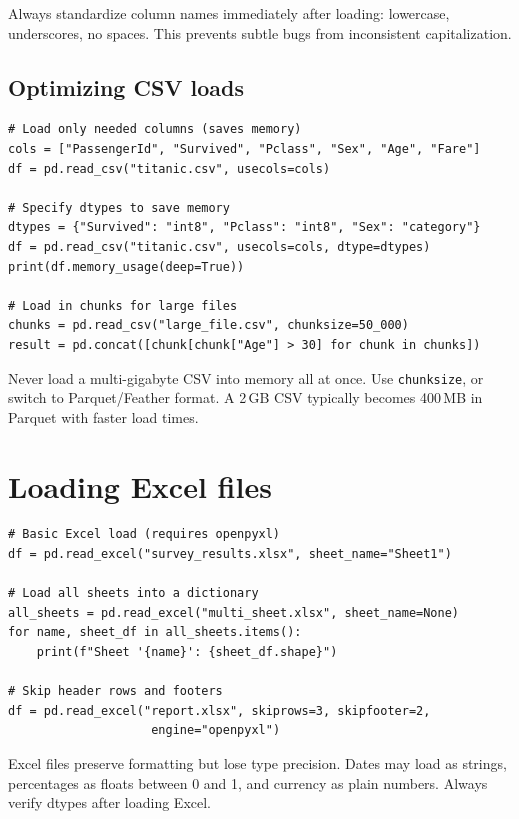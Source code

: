 \begin{preprocesstip}
Always standardize column names immediately after loading: lowercase, underscores, no spaces. This prevents subtle bugs from inconsistent capitalization.
\end{preprocesstip}

\subsection{Optimizing CSV loads}

\begin{verbatim}
# Load only needed columns (saves memory)
cols = ["PassengerId", "Survived", "Pclass", "Sex", "Age", "Fare"]
df = pd.read_csv("titanic.csv", usecols=cols)

# Specify dtypes to save memory
dtypes = {"Survived": "int8", "Pclass": "int8", "Sex": "category"}
df = pd.read_csv("titanic.csv", usecols=cols, dtype=dtypes)
print(df.memory_usage(deep=True))

# Load in chunks for large files
chunks = pd.read_csv("large_file.csv", chunksize=50_000)
result = pd.concat([chunk[chunk["Age"] > 30] for chunk in chunks])
\end{verbatim}

\begin{warningbox}
Never load a multi-gigabyte CSV into memory all at once. Use \texttt{chunksize}, or switch to Parquet/Feather format. A 2\,GB CSV typically becomes 400\,MB in Parquet with faster load times.
\end{warningbox}

\section{Loading Excel files}

\begin{verbatim}
# Basic Excel load (requires openpyxl)
df = pd.read_excel("survey_results.xlsx", sheet_name="Sheet1")

# Load all sheets into a dictionary
all_sheets = pd.read_excel("multi_sheet.xlsx", sheet_name=None)
for name, sheet_df in all_sheets.items():
    print(f"Sheet '{name}': {sheet_df.shape}")

# Skip header rows and footers
df = pd.read_excel("report.xlsx", skiprows=3, skipfooter=2,
                    engine="openpyxl")
\end{verbatim}

\begin{datatip}
Excel files preserve formatting but lose type precision. Dates may load as strings, percentages as floats between 0 and 1, and currency as plain numbers. Always verify dtypes after loading Excel.
\end{datatip}

